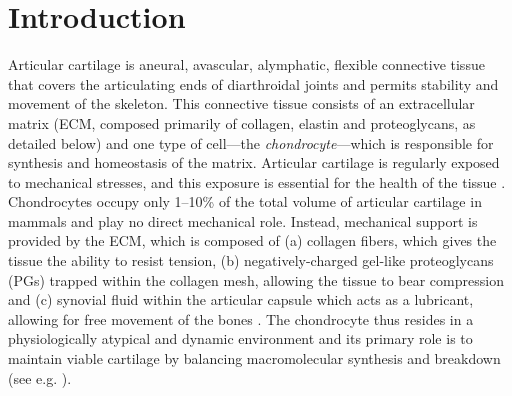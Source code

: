 \section*{Introduction}
\label{introduction}


Articular cartilage is aneural, avascular, alymphatic, flexible
connective tissue that covers the articulating ends of diarthroidal
joints \citep{Poole1997,Mankin1982} and permits stability and movement
of the skeleton. This connective tissue consists of an extracellular
matrix (ECM, composed primarily of collagen, elastin and
proteoglycans, as detailed below) and one type of cell---the {\em
  chondrocyte}---which is responsible for synthesis and homeostasis of
the matrix. Articular cartilage is regularly exposed to mechanical
stresses, and this exposure is essential for the health of the tissue
\citep{Stockwell1991}. Chondrocytes occupy only 1--10\% of the total
volume of articular cartilage in mammals \citep{CarneyMuir1988,
  Halletal1996} and play no direct mechanical role. Instead,
mechanical support is provided by the ECM, which is composed of (a)
collagen fibers, which gives the tissue the ability to resist tension,
(b) negatively-charged gel-like proteoglycans (PGs) trapped within the
collagen mesh, allowing the tissue to bear compression
\citep{Poole1997, BuckwalterMankin1998} and (c) synovial fluid within
the articular capsule which acts as a lubricant, allowing for free
movement of the bones \citep{Edwardsetal1994}. The chondrocyte thus
resides in a physiologically atypical and dynamic environment and its
primary role is to maintain viable cartilage by balancing
macromolecular synthesis and breakdown (see
e.g. \citet{Wilkinsetal2000, Stockwell1991, Fassbender1987}).

